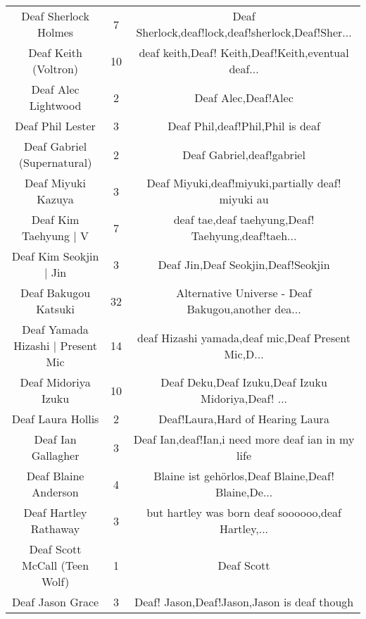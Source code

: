 \begin{table}[h!]
{\begin{tabular}{|c|c|c|}
                              Deaf Sherlock Holmes &      7 & Deaf Sherlock,deaf!lock,deaf!sherlock,Deaf!Sher... \\
                              Deaf Keith (Voltron) &     10 & deaf keith,Deaf! Keith,Deaf!Keith,eventual deaf... \\
                               Deaf Alec Lightwood &      2 &                                Deaf Alec,Deaf!Alec \\
                                  Deaf Phil Lester &      3 &                   Deaf Phil,deaf!Phil,Phil is deaf \\
                       Deaf Gabriel (Supernatural) &      2 &                          Deaf Gabriel,deaf!gabriel \\
                                Deaf Miyuki Kazuya &      3 &  Deaf Miyuki,deaf!miyuki,partially deaf! miyuki au \\
                             Deaf Kim Taehyung | V &      7 & deaf tae,deaf taehyung,Deaf! Taehyung,deaf!taeh... \\
                            Deaf Kim Seokjin | Jin &      3 &                 Deaf Jin,Deaf Seokjin,Deaf!Seokjin \\
                              Deaf Bakugou Katsuki &     32 & Alternative Universe - Deaf Bakugou,another dea... \\
                 Deaf Yamada Hizashi | Present Mic &     14 & deaf Hizashi yamada,deaf mic,Deaf Present Mic,D... \\
                               Deaf Midoriya Izuku &     10 & Deaf Deku,Deaf Izuku,Deaf Izuku Midoriya,Deaf! ... \\
                                 Deaf Laura Hollis &      2 &                   Deaf!Laura,Hard of Hearing Laura \\
                                Deaf Ian Gallagher &      3 &  Deaf Ian,deaf!Ian,i need more deaf ian in my life \\
                              Deaf Blaine Anderson &      4 & Blaine ist gehörlos,Deaf Blaine,Deaf! Blaine,De... \\
                             Deaf Hartley Rathaway &      3 & but hartley was born deaf soooooo,deaf Hartley,... \\
                     Deaf Scott McCall (Teen Wolf) &      1 &                                         Deaf Scott \\
                                  Deaf Jason Grace &      3 &        Deaf! Jason,Deaf!Jason,Jason is deaf though \\

\end{tabular}}
\end{table}
